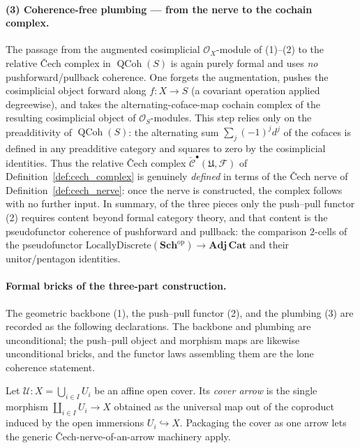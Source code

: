 \paragraph{(3) Coherence-free plumbing — from the nerve to the cochain complex.}
The passage from the augmented cosimplicial \(\mathcal{O}_X\)-module of (1)--(2)
to the relative {\v C}ech complex in \(\operatorname{QCoh}(S)\) is again purely
formal and uses \emph{no} pushforward/pullback coherence. One forgets the
augmentation, pushes the cosimplicial object forward along \(f : X \to S\) (a
covariant operation applied degreewise), and takes the alternating-coface-map
cochain complex of the resulting cosimplicial object of \(\mathcal{O}_S\)-modules.
This step relies only on the preadditivity of \(\operatorname{QCoh}(S)\): the
alternating sum \(\sum_{j} (-1)^j d^j\) of the cofaces is defined in any
preadditive category and squares to zero by the cosimplicial identities. Thus the
relative {\v C}ech complex \(\check{\mathcal{C}}^\bullet(\mathfrak{U}, \mathcal{F})\)
of Definition~\ref{def:cech_complex} is genuinely \emph{defined} in terms of the
{\v C}ech nerve of Definition~\ref{def:cech_nerve}: once the nerve is constructed,
the complex follows with no further input. In summary, of the three pieces only
the push--pull functor (2) requires content beyond formal category theory, and
that content is the pseudofunctor coherence of pushforward and pullback: the
comparison \(2\)-cells of the pseudofunctor
\(\mathrm{LocallyDiscrete}(\mathbf{Sch}^{\mathrm{op}}) \to \mathbf{Adj}\,\mathbf{Cat}\)
and their unitor/pentagon identities.

\paragraph{Formal bricks of the three-part construction.}
The geometric backbone (1), the push--pull functor (2), and the plumbing (3) are
recorded as the following declarations. The backbone and plumbing are
unconditional; the push--pull object and morphism maps are likewise unconditional
bricks, and the functor laws assembling them are the lone coherence statement.

\begin{definition}\leanok
  \label{def:cover_arrow}
  Let \(\mathcal{U} : X = \bigcup_{i \in I} U_i\) be an affine open cover. Its
  \emph{cover arrow} is the single morphism
  \(\coprod_{i \in I} U_i \longrightarrow X\) obtained as the universal map out of
  the coproduct induced by the open immersions \(U_i \hookrightarrow X\). Packaging
  the cover as one arrow lets the generic {\v C}ech-nerve-of-an-arrow machinery
  apply.
\end{definition}

